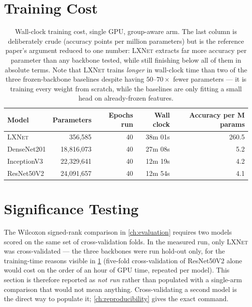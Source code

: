 \documentclass[11pt,a4paper,oneside]{report}
\newcommand{\LXNet}{\textsc{LXNet}}
\begin{document}
\section{Training Cost}

\begin{table}[h]
\centering
\small
\begin{tabular}{@{}lrrrr@{}}
\toprule
\textbf{Model} & \textbf{Parameters} & \textbf{Epochs run} & \textbf{Wall clock} &
\textbf{Accuracy per M params} \\
\midrule
\LXNet{} & 356{,}585 & 40 & 38m 01s & 260.5 \\
DenseNet201 & 18{,}816{,}073 & 40 & 27m 08s & 5.2 \\
InceptionV3 & 22{,}329{,}641 & 40 & 12m 19s & 4.2 \\
ResNet50V2 & 24{,}091{,}657 & 40 & 12m 54s & 4.1 \\
\bottomrule
\end{tabular}
\caption{Wall-clock training cost, single GPU, group-aware arm. The last
column is deliberately crude (accuracy points per million parameters) but is
the reference paper's argument reduced to one number: \LXNet{} extracts far
more accuracy per parameter than any backbone tested, while still finishing
below all of them in absolute terms. Note that \LXNet{} trains \emph{longer}
in wall-clock time than two of the three frozen-backbone baselines despite
having $50$--$70\times$ fewer parameters --- it is training every weight from
scratch, while the baselines are only fitting a small head on already-frozen
features.}
\label{tab:training-cost}
\end{table}

\section{Significance Testing}
\label{sec:significance}

The Wilcoxon signed-rank comparison in \cref{ch:evaluation} requires two
models scored on the same set of cross-validation folds. In the measured
run, only \LXNet{} was cross-validated --- the three backbones were run
hold-out only, for the training-time reasons visible in
\cref{tab:training-cost} (five-fold cross-validation of ResNet50V2 alone
would cost on the order of an hour of GPU time, repeated per model). This
section is therefore reported as \emph{not run} rather than populated with a
single-arm comparison that would not mean anything. Cross-validating a second
model is the direct way to populate it; \cref{ch:reproducibility} gives the
exact command.
\end{document}
